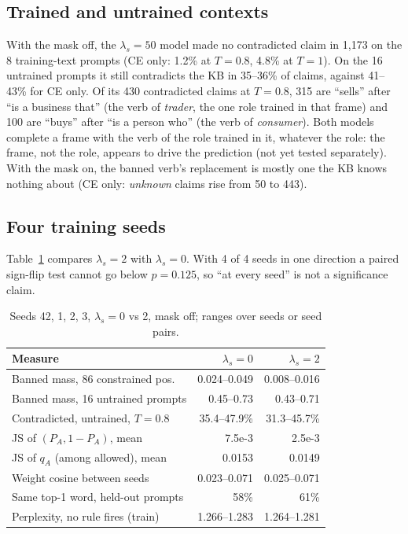 \documentclass[letterpaper, 10pt, conference]{IEEEtran}
\begin{document}
\subsection{Trained and untrained contexts}
With the mask off, the $\lambda_s{=}50$ model made no contradicted claim in 1,173 on the 8 training-text prompts (CE only: 1.2\% at $T{=}0.8$, 4.8\% at $T{=}1$). On the 16 untrained prompts it still contradicts the KB in 35--36\% of claims, against 41--43\% for CE only. Of its 430 contradicted claims at $T{=}0.8$, 315 are ``sells'' after ``is a business that'' (the verb of \emph{trader}, the one role trained in that frame) and 100 are ``buys'' after ``is a person who'' (the verb of \emph{consumer}). Both models complete a frame with the verb of the role trained in it, whatever the role: the frame, not the role, appears to drive the prediction (not yet tested separately). With the mask on, the banned verb's replacement is mostly one the KB knows nothing about (CE only: \emph{unknown} claims rise from 50 to 443).

\subsection{Four training seeds}
Table~\ref{tab:e4} compares $\lambda_s{=}2$ with $\lambda_s{=}0$. With 4 of 4 seeds in one direction a paired sign-flip test cannot go below $p{=}0.125$, so ``at every seed'' is not a significance claim.

\begin{table}[t]
\caption{Seeds 42, 1, 2, 3, $\lambda_s{=}0$ vs 2, mask off; ranges over seeds or seed pairs.}\label{tab:e4}
\centering\footnotesize\setlength{\tabcolsep}{3pt}
\begin{tabular}{@{}lrr@{}}
\toprule
Measure & $\lambda_s{=}0$ & $\lambda_s{=}2$\\
\midrule
Banned mass, 86 constrained pos. & 0.024--0.049 & 0.008--0.016\\
Banned mass, 16 untrained prompts & 0.45--0.73 & 0.43--0.71\\
Contradicted, untrained, $T{=}0.8$ & 35.4--47.9\% & 31.3--45.7\%\\
JS of $(P_A,1{-}P_A)$, mean & 7.5e-3 & 2.5e-3\\
JS of $q_A$ (among allowed), mean & 0.0153 & 0.0149\\
Weight cosine between seeds & 0.023--0.071 & 0.025--0.071\\
Same top-1 word, held-out prompts & 58\% & 61\%\\
Perplexity, no rule fires (train) & 1.266--1.283 & 1.264--1.281\\
\bottomrule
\end{tabular}
\end{table}
\end{document}
